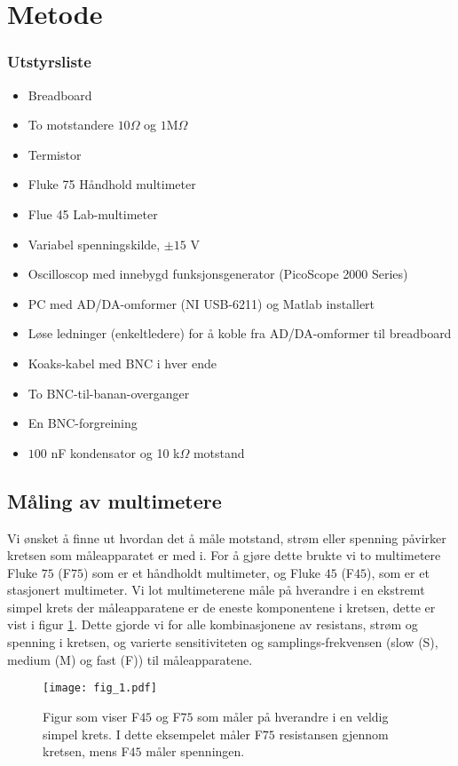 \documentclass[%
 reprint,
nofootinbib,
aps,
]{revtex4-1}
\begin{document}
\section{\label{metode1}Metode}
\subsubsection*{Utstyrsliste}
\begin{itemize}
\item Breadboard
\item To motstandere $10\Omega$ og $1$M$\Omega$
\item Termistor
\item Fluke 75 Håndhold multimeter
\item Flue 45 Lab-multimeter
\item Variabel spenningskilde, $\pm 15$ V
\item Oscilloscop med innebygd funksjonsgenerator (PicoScope 2000 Series)
\item PC med AD/DA-omformer (NI USB-6211) og Matlab installert
\item Løse ledninger (enkeltledere) for å koble fra AD/DA-omformer til breadboard
\item Koaks-kabel med BNC i hver ende
\item To BNC-til-banan-overganger
\item En BNC-forgreining
\item $100$ nF kondensator og 10 k$\Omega$ motstand
\end{itemize}
\subsection{Måling av multimetere}
Vi ønsket å finne ut hvordan det å måle motstand, strøm eller spenning påvirker kretsen som måleapparatet er med i. For å gjøre dette brukte vi to multimetere Fluke $75$ (F$75$) som er et håndholdt multimeter, og Fluke $45$ (F$45$), som er et stasjonert multimeter. Vi lot multimeterene måle på hverandre i en ekstremt simpel krets der måleapparatene er de eneste komponentene i kretsen, dette er vist i figur \ref{fig1}. Dette gjorde vi for alle kombinasjonene av resistans, strøm og spenning i kretsen, og varierte sensitiviteten og samplings-frekvensen (slow (S), medium (M) og fast (F)) til måleapparatene. \\
\begin{figure}[h!]
    \centering
    \texttt{[image: fig\_1.pdf]}
    \caption{Figur som viser F$45$ og F$75$ som måler på hverandre i en veldig simpel krets. I dette eksempelet måler F$75$ resistansen gjennom kretsen, mens F$45$ måler spenningen.}
    \label{fig1}
\end{figure}
\end{document}
